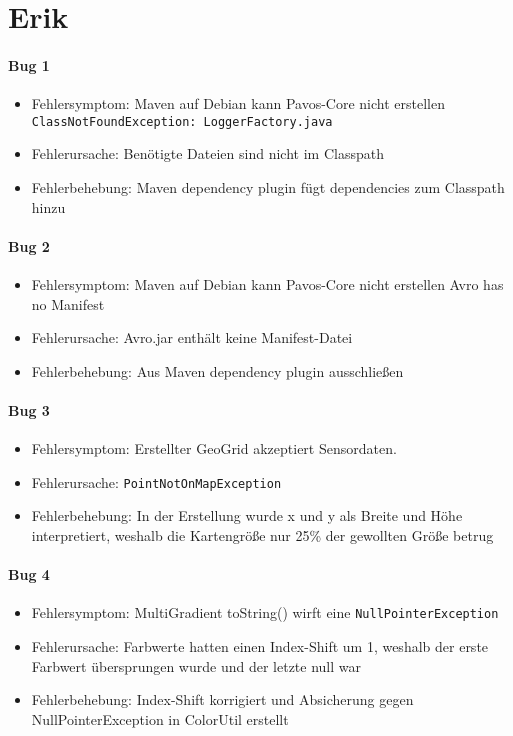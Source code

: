 \section{Erik}
\paragraph{Bug 1}
\begin{itemize}
	\item Fehlersymptom: Maven auf Debian kann Pavos-Core nicht erstellen\\
	\texttt{ClassNotFoundException: LoggerFactory.java}
	\item Fehlerursache: Benötigte Dateien sind nicht im Classpath
	\item Fehlerbehebung: Maven dependency plugin fügt dependencies zum Classpath hinzu
\end{itemize}

\paragraph{Bug 2}
\begin{itemize}
	\item Fehlersymptom: Maven auf Debian kann Pavos-Core nicht erstellen
	Avro has no Manifest
	\item Fehlerursache: Avro.jar enthält keine Manifest-Datei
	\item Fehlerbehebung: Aus Maven dependency plugin ausschließen
\end{itemize}

\paragraph{Bug 3}
\begin{itemize}
	\item Fehlersymptom: Erstellter GeoGrid akzeptiert Sensordaten.
	\item Fehlerursache: \texttt{PointNotOnMapException}
	\item Fehlerbehebung: In der Erstellung wurde x und y als Breite und Höhe interpretiert, weshalb die Kartengröße nur 25\% der gewollten Größe betrug
\end{itemize}

\paragraph{Bug 4}
\begin{itemize}
	\item Fehlersymptom: MultiGradient toString() wirft eine \texttt{NullPointerException}
	\item Fehlerursache: Farbwerte hatten einen Index-Shift um 1, weshalb der erste Farbwert übersprungen wurde und der letzte null war
	\item Fehlerbehebung: Index-Shift korrigiert und Absicherung gegen NullPointerException in ColorUtil erstellt
\end{itemize}

